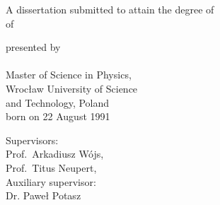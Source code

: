 \begin{titlepage}
    \begin{center}
        \large

        \hfill

        \vfill

        \begingroup
            \spacedallcaps{\myTitle}
        \endgroup

        \vfill

        \begingroup
            A dissertation submitted to attain the degree of\\
            \vspace{0.7em}
            of
        \endgroup

        \vfill

        \begingroup
            presented by\\
            \vspace{0.5em}
            \spacedallcaps{\myName}\\ \vspace{0.5em}
            Master of Science in Physics, \\  \vspace{0.5em} Wrocław University of Science \\ and Technology, Poland \\
            \vspace{0.5em}
            born on 22 August 1991\\
        \endgroup

        \vfill

        \begingroup
			Supervisors: \\
            \vspace{0.5em}
            Prof.\ Arkadiusz Wójs, \\  \vspace{0.3em}
            Prof.\ Titus Neupert, \\         \vspace{1em}
            	Auxiliary supervisor: \\
             \vspace{0.5em}
             Dr. Paweł Potasz
        \endgroup

        \vfill

        \myTime%

        \vfill
    \end{center}
\end{titlepage}
